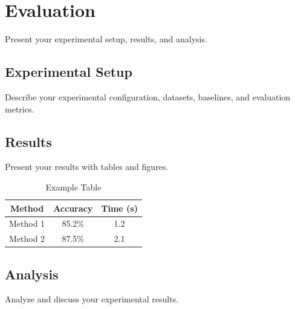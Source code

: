\section{Evaluation}
\label{sec:evaluation}

Present your experimental setup, results, and analysis.

\subsection{Experimental Setup}
\label{subsec:setup}

Describe your experimental configuration, datasets, baselines, and evaluation metrics.


\subsection{Results}
\label{subsec:results}

Present your results with tables and figures.

\begin{table}[htbp]
\caption{Example Table}
\centering
\begin{tabular}{|c|c|c|}
\hline
Method & Accuracy & Time (s) \\
\hline
Method 1 & 85.2\% & 1.2 \\
Method 2 & 87.5\% & 2.1 \\
\hline
\end{tabular}
\label{tab:example}
\end{table}


\subsection{Analysis}
\label{subsec:analysis}

Analyze and discuss your experimental results.

